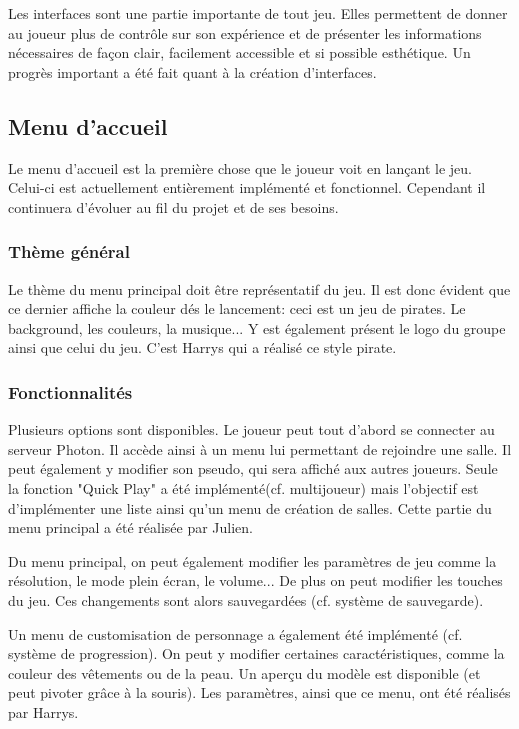 \documentclass[../doc.tex]{subfiles}
\begin{document}
Les interfaces sont une partie importante de tout jeu. Elles permettent de donner au joueur plus de contrôle sur son expérience et de présenter les informations nécessaires de façon clair, facilement accessible et si possible esthétique.
Un progrès important a été fait quant à la création d'interfaces.

\subsection{Menu d'accueil}
    Le menu d'accueil est la première chose que le joueur voit en lançant le jeu.
    Celui-ci est actuellement entièrement implémenté et fonctionnel. Cependant il continuera d'évoluer au fil du projet et de ses besoins.
    
    \subsubsection{Thème général}
    Le thème du menu principal doit être représentatif du jeu. Il est donc évident que ce dernier affiche la couleur dés le lancement: ceci est un jeu de pirates.
    Le background, les couleurs, la musique... Y est également présent le logo du groupe ainsi que celui du jeu. C'est Harrys qui a réalisé ce style pirate. 
    
    \subsubsection{Fonctionnalités}
    Plusieurs options sont disponibles. Le joueur peut tout d'abord se connecter au serveur Photon. Il accède ainsi à un menu lui permettant de rejoindre une salle. Il peut également y modifier son pseudo, qui sera affiché aux autres joueurs. Seule la fonction "Quick Play" a été implémenté(cf. multijoueur) mais l'objectif est d'implémenter une liste ainsi qu'un menu de création de salles. Cette partie du menu principal a été réalisée par Julien.
    
    Du menu principal, on peut également modifier les paramètres de jeu comme la résolution, le mode plein écran, le volume... De plus on peut modifier les touches du jeu. Ces changements sont alors sauvegardées (cf. système de sauvegarde).
    
    Un menu de customisation de personnage a également été implémenté (cf. système de progression). On peut y modifier certaines caractéristiques, comme la couleur des vêtements ou de la peau. Un aperçu du modèle est disponible (et peut pivoter grâce à la souris). Les paramètres, ainsi que ce menu, ont été réalisés par Harrys.
    
\end{document}
